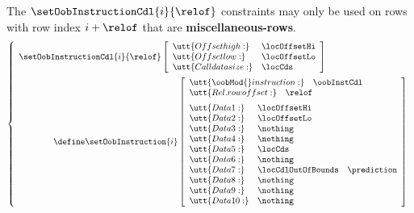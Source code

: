 \saNote{} The $\setOobInstructionCdl {i}{\relof}$ constraints may only be used on rows with row index $i + \relof$ that are \textbf{miscellaneous-rows}.
\[
        \left\{ \begin{array}{l}
                \setOobInstructionCdl {i}{\relof}
                \left[ \begin{array}{ll}
                        \utt{Offset high:} & \locOffsetHi \\
                        \utt{Offset low:}  & \locOffsetLo \\
                        \utt{Call data size:} & \locCds \\
                \end{array} \right] \vspace{2mm} \\
                \qquad \qquad \define
                \setOobInstruction{i}
                \left[ \begin{array}{llr}
                        \multicolumn{3}{l}{\utt{\oobMod{} instruction:} \quad \oobInstCdl} \\
                        \multicolumn{3}{l}{\utt{Rel. row offset:}            \quad \relof}         \vspace{2mm} \\
                        \utt{Data 1:}  & \locOffsetHi       \\
                        \utt{Data 2:}  & \locOffsetLo       \\
                        \utt{Data 3:}  & \nothing           \\
                        \utt{Data 4:}  & \nothing           \\
                        \utt{Data 5:}  & \locCds            \\
                        \utt{Data 6:}  & \nothing           \\
                        \utt{Data 7:}  & \locCdlOutOfBounds  & \prediction \\
                        \utt{Data 8:}  & \nothing           \\
                        \utt{Data 9:}  & \nothing           \\
                        \utt{Data 10:} & \nothing           \\
                \end{array} \right] \\
        \end{array} \right.
\]
